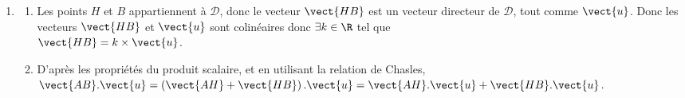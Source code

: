 \begin{enumerate}
\begin{enumerate}
$2x-y+2z+d=0$. Or $A\in \mathcal{P}$ donc $-2-1+6+d=0$ donc $d=-3$. Donc $\mathcal{P}$ a pour équation $2x-y+2z-3=0$
		\item Le projeté orthogonal de $A$ sur la droite $\mathcal{D}$, noté $H$, est l'unique point d'intersection de $\mathcal{P}$ et $\mathcal{D}$. Résolvons donc le système suivant : \\
	$\left\{\begin{array}{l c l} 2x-y + 2z-3&=&0\\x&=&1+2t\\y &=& 2 - t\\z&=& 2+2t \end{array}\right.$. On remplace $x$, $y$ et $z$ dans la première équation :\\
	$2x-y+2z-3=0\iff 2(1 + 2t)-(2 - t)+2(2 + 2t) - 3 = 0 \iff $
	
$2 + 4t  - 2 + t + 4 + 4t = 0 \iff 9t + 1= 0\iff t = -\dfrac{1}{9}$.\\
	On remplace la valeur de $t$ dans les trois dernières équations :\\
		$\left\{\begin{array}{l c l} x&=&1+2\times-\dfrac{1}{9}=\dfrac{7}{9} \\y &=& 2 - \left(-\dfrac{1}{9}\right)=\dfrac{19}{9}\\z&=& 2+2 \times \left(-\dfrac{1}{9}\right) =\dfrac{16}{9} \end{array}\right.$. Donc $H\left(\dfrac79~;~\dfrac{19}{9}~;~\dfrac{16}{9}\right)$.
		\item Déterminons les coordonnées de $\vect{AH}$ avec $A(-1~;~1~;~3)$ et $H\left(\dfrac79~;~\dfrac{19}{9}~;~\dfrac{16}{9}\right)$ : \(\overrightarrow{AH}\begin{pmatrix}\frac{16}{9}\\\frac{10}{9}\\-\frac{11}{9}\end{pmatrix}\).

Donc $\left\| \vect{AH}\right\| =\sqrt{\left(\dfrac{16}{9}\right)^2+\left(\dfrac{10}{9}\right)^2+\left(-\dfrac{11}{9}\right)^2}=\dfrac{\sqrt{477}}{9}=\dfrac{\sqrt{53}}{3}$
\end{enumerate}
\item 
\begin{enumerate}
	\item Les points $H$ et $B$ appartiennent à $\mathcal{D}$, donc le vecteur $\vect{HB}$ est un vecteur directeur de $\mathcal{D}$, tout comme $\vect{u}$. Donc les vecteurs $\vect{HB}$ et $\vect{u}$ sont colinéaires donc $\exists k \in \R$ tel que \\$\vect{HB}=k\times \vect{u}$.
	\item D'après les propriétés du produit scalaire, et en utilisant la relation de Chasles, \\ $\vect{AB}.\vect{u}=\left(\vect{AH}+\vect{HB}\right).\vect{u}=\vect{AH}.\vect{u}+ \vect{HB}.\vect{u}$.
	

\end{enumerate}
\end{enumerate}
